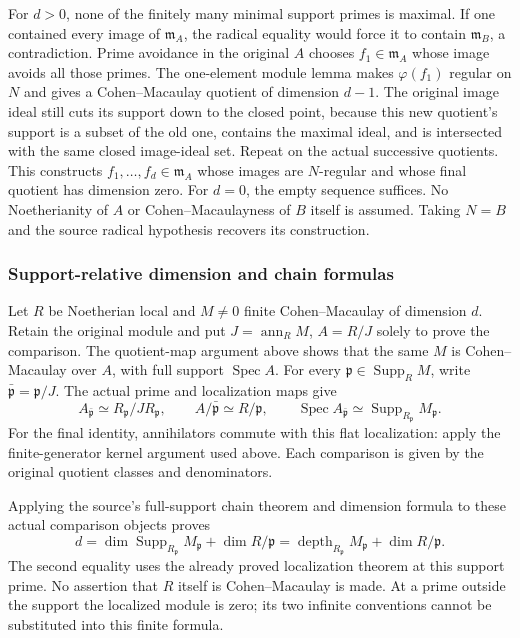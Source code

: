 For \(d>0\), none of the finitely many minimal support primes is maximal. If one contained every image of \(\mathfrak m_A\), the radical equality would force it to contain \(\mathfrak m_B\), a contradiction. Prime avoidance in the original \(A\) chooses \(f_1\in\mathfrak m_A\) whose image avoids all those primes. The one-element module lemma makes \(\varphi(f_1)\) regular on \(N\) and gives a Cohen--Macaulay quotient of dimension \(d-1\). The original image ideal still cuts its support down to the closed point, because this new quotient's support is a subset of the old one, contains the maximal ideal, and is intersected with the same closed image-ideal set. Repeat on the actual successive quotients. This constructs \(f_1,\ldots,f_d\in\mathfrak m_A\) whose images are \(N\)-regular and whose final quotient has dimension zero. For \(d=0\), the empty sequence suffices. No Noetherianity of \(A\) or Cohen--Macaulayness of \(B\) itself is assumed. Taking \(N=B\) and the source radical hypothesis recovers its construction.

\subsubsection{Support-relative dimension and chain formulas}\label{algebra-proof-019-support-relative-dimension-and-chain-formulas}

Let \(R\) be Noetherian local and \(M\ne0\) finite Cohen--Macaulay of dimension \(d\). Retain the original module and put \(J=\operatorname{ann}_R M\), \(A=R/J\) solely to prove the comparison. The quotient-map argument above shows that the same \(M\) is Cohen--Macaulay over \(A\), with full support \(\operatorname{Spec}A\). For every \(\mathfrak p\in\operatorname{Supp}_R M\), write \(\bar{\mathfrak p}=\mathfrak p/J\). The actual prime and localization maps give \[
 A_{\bar{\mathfrak p}}\simeq R_{\mathfrak p}/JR_{\mathfrak p},\qquad
 A/\bar{\mathfrak p}\simeq R/\mathfrak p,\qquad
 \operatorname{Spec}A_{\bar{\mathfrak p}}\simeq
 \operatorname{Supp}_{R_{\mathfrak p}}M_{\mathfrak p}.
\] For the final identity, annihilators commute with this flat localization: apply the finite-generator kernel argument used above. Each comparison is given by the original quotient classes and denominators.

Applying the source's full-support chain theorem and dimension formula to these actual comparison objects proves \[
 d=\dim\operatorname{Supp}_{R_{\mathfrak p}}M_{\mathfrak p}
       +\dim R/\mathfrak p
   =\operatorname{depth}_{R_{\mathfrak p}}M_{\mathfrak p}
       +\dim R/\mathfrak p .
\] The second equality uses the already proved localization theorem at this support prime. No assertion that \(R\) itself is Cohen--Macaulay is made. At a prime outside the support the localized module is zero; its two infinite conventions cannot be substituted into this finite formula.

